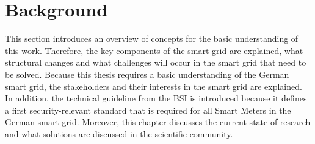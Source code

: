 \chapter{Background}
\label{sec:state}







This section introduces an overview of concepts for the basic understanding of this work. Therefore, the key components of the smart grid are explained, what structural changes and what challenges will occur in the smart grid that need to be solved. Because this thesis requires a basic understanding of the German smart grid, the stakeholders and their interests in the smart grid are explained. In addition, the technical guideline from the BSI is introduced because it defines a first security-relevant standard that is required for all Smart Meters in the German smart grid. Moreover, this chapter discusses the current state of research and what solutions are discussed in the scientific community.\\

